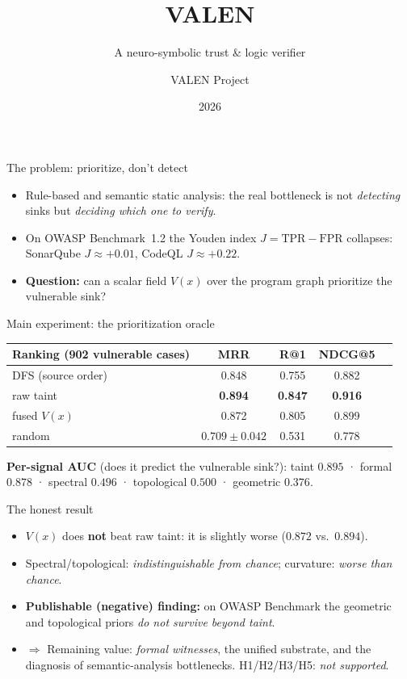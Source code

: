 \documentclass[aspectratio=169,11pt]{beamer}
\title[VALEN]{VALEN}
\subtitle{A neuro-symbolic trust \& logic verifier}
\author{VALEN Project}
\institute{Typed IR $\cdot$ authorization invariants $\cdot$ directed homology $\cdot$ Z3 witnesses}
\date{2026}
\begin{document}
\begin{frame}
  \titlepage
\end{frame}

\begin{frame}{The problem: prioritize, don't detect}
  \begin{itemize}
    \item Rule-based and semantic static analysis: the real bottleneck is not
          \emph{detecting} sinks but \emph{deciding which one to verify}.
    \item On OWASP Benchmark~1.2 the Youden index $J=\mathrm{TPR}-\mathrm{FPR}$ collapses:
          SonarQube $J\approx+0.01$, CodeQL $J\approx+0.22$.
    \item \textbf{Question:} can a scalar field $V(x)$ over the program graph
          prioritize the vulnerable sink?
  \end{itemize}
\end{frame}

\begin{frame}{Main experiment: the prioritization oracle}
  \begin{center}
  \small
  \begin{tabular}{lcccc}
  \toprule
  Ranking (902 vulnerable cases) & MRR & R@1 & NDCG@5 \\
  \midrule
  DFS (source order) & 0.848 & 0.755 & 0.882 \\
  raw taint & \textbf{0.894} & \textbf{0.847} & \textbf{0.916} \\
  fused $V(x)$ & 0.872 & 0.805 & 0.899 \\
  random & $0.709\pm0.042$ & 0.531 & 0.778 \\
  \bottomrule
  \end{tabular}
  \end{center}
  \vspace{1mm}
  \textbf{Per-signal AUC} (does it predict the vulnerable sink?):
  taint $0.895$ · formal $0.878$ · spectral $0.496$ ·
  topological $0.500$ · geometric $\mathbf{0.376}$.
\end{frame}

\begin{frame}{The honest result}
  \begin{itemize}
    \item $V(x)$ does \textbf{not} beat raw taint: it is slightly worse ($0.872$ vs.\ $0.894$).
    \item Spectral/topological: \emph{indistinguishable from chance}; curvature: \emph{worse than chance}.
    \item \textbf{Publishable (negative) finding:} on OWASP Benchmark the geometric
          and topological priors \emph{do not survive beyond taint}.
    \item $\Rightarrow$ Remaining value: \emph{formal witnesses}, the unified
          substrate, and the diagnosis of semantic-analysis bottlenecks.
          H1/H2/H3/H5: \emph{not supported}.
  \end{itemize}
\end{frame}
\end{document}
